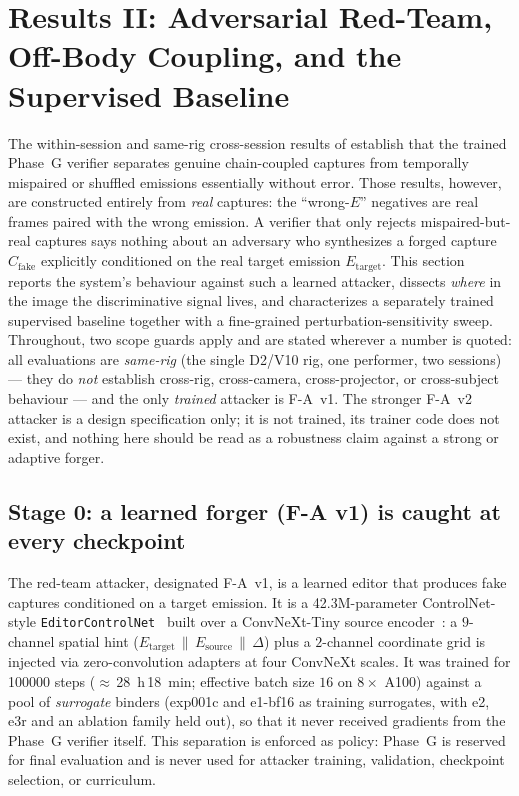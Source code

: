 \section{Results II: Adversarial Red-Team, Off-Body Coupling, and the Supervised Baseline}
\label{sec:results_redteam}

The within-session and same-rig cross-session results of  establish that the trained Phase~G verifier separates genuine chain-coupled captures from temporally mispaired or shuffled emissions essentially without error. Those results, however, are constructed entirely from \emph{real} captures: the ``wrong-$E$'' negatives are real frames paired with the wrong emission. A verifier that only rejects mispaired-but-real captures says nothing about an adversary who synthesizes a forged capture $C_{\mathrm{fake}}$ explicitly conditioned on the real target emission $E_{\mathrm{target}}$. This section reports the system's behaviour against such a learned attacker, dissects \emph{where} in the image the discriminative signal lives, and characterizes a separately trained supervised baseline together with a fine-grained perturbation-sensitivity sweep. Throughout, two scope guards apply and are stated wherever a number is quoted: all evaluations are \emph{same-rig} (the single D2/V10 rig, one performer, two sessions) --- they do \emph{not} establish cross-rig, cross-camera, cross-projector, or cross-subject behaviour --- and the only \emph{trained} attacker is F-A~v1. The stronger F-A~v2 attacker is a design specification only; it is not trained, its trainer code does not exist, and nothing here should be read as a robustness claim against a strong or adaptive forger.

\subsection{Stage 0: a learned forger (F-A v1) is caught at every checkpoint}
\label{sec:redteam_stage0}

The red-team attacker, designated F-A~v1, is a learned editor that produces fake captures conditioned on a target emission. It is a 42.3M-parameter ControlNet-style \texttt{EditorControlNet}~\cite{zhang2023controlnet} built over a ConvNeXt-Tiny source encoder~\cite{liu2022convnext}: a $9$-channel spatial hint ($E_{\mathrm{target}}\,\|\,E_{\mathrm{source}}\,\|\,\Delta$) plus a $2$-channel coordinate grid is injected via zero-convolution adapters at four ConvNeXt scales. It was trained for \num{100000} steps ($\approx$\,\SI{28}{\hour}\,\SI{18}{\minute}; effective batch size $16$ on $8\times$ A100) against a pool of \emph{surrogate} binders (exp001c and e1-bf16 as training surrogates, with e2, e3r and an ablation family held out), so that it never received gradients from the Phase~G verifier itself. This separation is enforced as policy: Phase~G is reserved for final evaluation and is never used for attacker training, validation, checkpoint selection, or curriculum.

